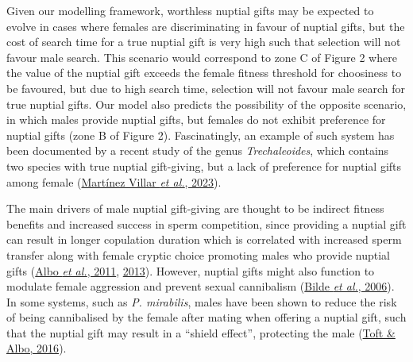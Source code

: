 \documentclass[
]{article}
\begin{document}
Given our modelling framework, worthless nuptial gifts may be expected
to evolve in cases where females are discriminating in favour of nuptial
gifts, but the cost of search time for a true nuptial gift is very high
such that selection will not favour male search. This scenario would
correspond to zone C of Figure 2 where the value of the nuptial gift
exceeds the female fitness threshold for choosiness to be favoured, but
due to high search time, selection will not favour male search for true
nuptial gifts. Our model also predicts the possibility of the opposite
scenario, in which males provide nuptial gifts, but females do not
exhibit preference for nuptial gifts (zone B of Figure 2).
Fascinatingly, an example of such system has been documented by a recent
study of the genus \emph{Trechaleoides}, which contains two species with
true nuptial gift-giving, but a lack of preference for nuptial gifts
among female (\protect\hyperlink{ref-Martinez2023}{Martínez Villar
\emph{et al.}, 2023}).

The main drivers of male nuptial gift-giving are thought to be indirect
fitness benefits and increased success in sperm competition, since
providing a nuptial gift can result in longer copulation duration which
is correlated with increased sperm transfer along with female cryptic
choice promoting males who provide nuptial gifts
(\protect\hyperlink{ref-Albo2011}{Albo \emph{et al.}, 2011},
\protect\hyperlink{ref-Albo2013}{2013}). However, nuptial gifts might
also function to modulate female aggression and prevent sexual
cannibalism (\protect\hyperlink{ref-Bilde2006}{Bilde \emph{et al.},
2006}). In some systems, such as \emph{P. mirabilis}, males have been
shown to reduce the risk of being cannibalised by the female after
mating when offering a nuptial gift, such that the nuptial gift may
result in a ``shield effect'', protecting the male
(\protect\hyperlink{ref-Toft2016}{Toft \& Albo, 2016}).
\end{document}
